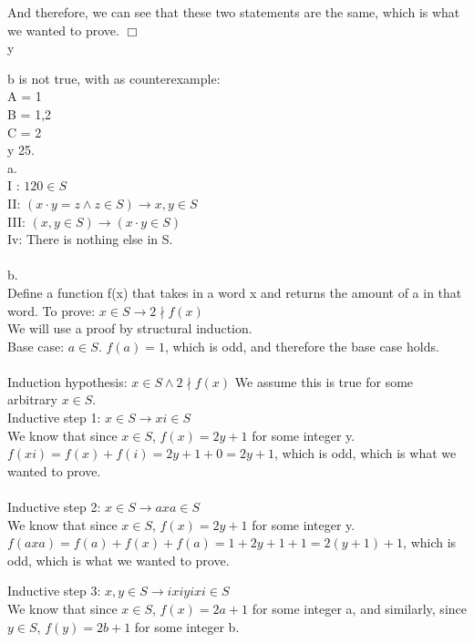 \documentclass{article}
\begin{document}
And therefore, we can see that these two statements are the same, which is what we wanted to prove. $\Box$\\
y

b is not true, with as counterexample:\\
A = {1}\\
B = {1,2}\\
C = {2}\\
y
25.\\
a. \\
I : $120 \in S$\\
II: $(x \cdot y = z \land z \in S) \rightarrow x,y \in S$\\
III: $(x,y \in S) \rightarrow (x \cdot y \in S)$\\
Iv: There is nothing else in S.\\
\\
b.\\
Define a function f(x) that takes in a word x and returns the amount of a in that word. To prove: $x \in S \rightarrow 2 \nmid f(x) $\\
We will use a proof by structural induction.\\
Base case: $a \in S$. $f(a) = 1$, which is odd, and therefore the base case holds.\\
\\
Induction hypothesis: $x \in S \land 2 \nmid f(x)$
We assume this is true for some arbitrary $x \in S$.\\

Inductive step 1: $x \in S \rightarrow xi \in S$\\
We know that since $x \in S$, $f(x)=2y+1$ for some integer y.
$f(xi) = f(x)+f(i) = 2y+1 + 0 = 2y+1$, which is odd, which is what we wanted to prove.\\
\\

Inductive step 2: $x \in S \rightarrow axa \in S$\\
We know that since $x \in S$, $f(x)=2y+1$ for some integer y.
$f(axa) = f(a)+f(x)+f(a) = 1+ 2y+1 + 1 = 2(y+1)+1$, which is odd, which is what we wanted to prove.

Inductive step 3: $x,y \in S \rightarrow ixiyixi \in S$\\

We know that since $x \in S$, $f(x)=2a+1$ for some integer a, and similarly, since $y \in S$, $f(y)=2b+1$ for some integer b.\\
\end{document}
